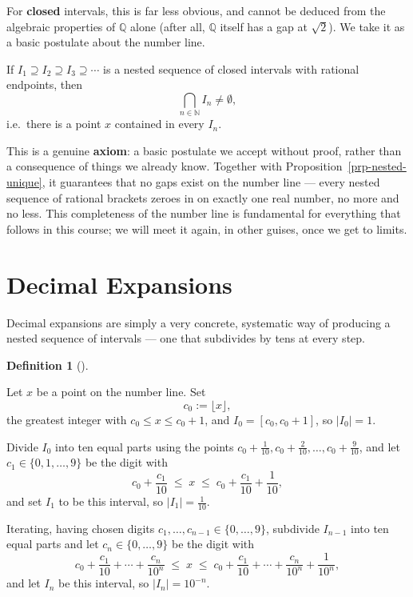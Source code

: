 \documentclass[
  letterpaper,
  DIV=11,
  numbers=noendperiod]{scrreprt}
\theoremstyle{plain}
\theoremstyle{plain}
\theoremstyle{definition}
\newtheorem{definition}{Definition}[chapter]
\theoremstyle{definition}
\theoremstyle{definition}
\theoremstyle{plain}
\theoremstyle{plain}
\theoremstyle{remark}
\begin{document}
For \textbf{closed} intervals, this is far less obvious, and cannot be
deduced from the algebraic properties of \(\mathbb{Q}\) alone (after
all, \(\mathbb{Q}\) itself has a gap at \(\sqrt2\)). We take it as a
basic postulate about the number line.

\begin{tcolorbox}[enhanced jigsaw, arc=.35mm, bottomrule=.15mm, bottomtitle=1mm, breakable, colback=white, colbacktitle=quarto-callout-important-color!10!white, colframe=quarto-callout-important-color-frame, coltitle=black, left=2mm, leftrule=.75mm, opacityback=0, opacitybacktitle=0.6, rightrule=.15mm, title={Axiom (Nested Interval Property)}, titlerule=0mm, toprule=.15mm, toptitle=1mm]

If \(I_1 \supseteq I_2 \supseteq I_3 \supseteq \cdots\) is a nested
sequence of closed intervals with rational endpoints, then \[
\bigcap_{n\in\mathbb{N}} I_n \neq \emptyset,
\] i.e.~there is a point \(x\) contained in every \(I_n\).

\end{tcolorbox}

This is a genuine \textbf{axiom}: a basic postulate we accept without
proof, rather than a consequence of things we already know. Together
with Proposition~\ref{prp-nested-unique}, it guarantees that no gaps
exist on the number line --- every nested sequence of rational brackets
zeroes in on exactly one real number, no more and no less. This
completeness of the number line is fundamental for everything that
follows in this course; we will meet it again, in other guises, once we
get to limits.

\section{Decimal Expansions}\label{decimal-expansions}

Decimal expansions are simply a very concrete, systematic way of
producing a nested sequence of intervals --- one that subdivides by tens
at every step.

\begin{definition}[]\protect\hypertarget{def-decimal-expansion}{}\label{def-decimal-expansion}

\hfill\break
Let \(x\) be a point on the number line. Set \[
c_0 := \lfloor x \rfloor,
\] the greatest integer with \(c_0 \le x \le c_0+1\), and
\(I_0 = [c_0, c_0+1]\), so \(|I_0|=1\).

Divide \(I_0\) into ten equal parts using the points
\(c_0+\tfrac1{10}, c_0+\tfrac2{10},\dots,
c_0+\tfrac9{10}\), and let \(c_1\in\{0,1,\dots,9\}\) be the digit with
\[
c_0 + \frac{c_1}{10} \;\le\; x \;\le\; c_0 + \frac{c_1}{10} + \frac{1}{10},
\] and set \(I_1\) to be this interval, so \(|I_1| = \tfrac1{10}\).

Iterating, having chosen digits \(c_1,\dots,c_{n-1}\in\{0,\dots,9\}\),
subdivide \(I_{n-1}\) into ten equal parts and let
\(c_n\in\{0,\dots,9\}\) be the digit with \[
c_0 + \frac{c_1}{10} + \cdots + \frac{c_n}{10^n} \;\le\; x \;\le\; c_0 + \frac{c_1}{10} + \cdots +
\frac{c_n}{10^n} + \frac{1}{10^n},
\] and let \(I_n\) be this interval, so \(|I_n| = 10^{-n}\).

\end{definition}
\end{document}
